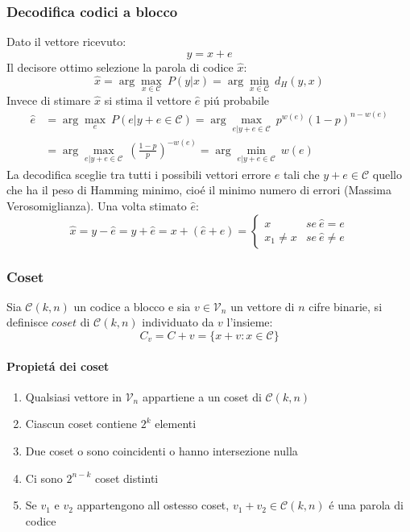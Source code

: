         \subsubsection{Decodifica codici a blocco}
            Dato il vettore ricevuto:
            \[
                y = x+e
            \]
            Il decisore ottimo selezione la parola di codice $\hat{x}$:
            \[
                \hat{x} = \arg \underset{x\in\mathcal{C}}{\max}\ P(y|x) = \arg \underset{x\in\mathcal{C}}{\min}\ d_H(y,x)   
            \]
            Invece di stimare $\hat{x}$ si stima il vettore $\hat{e}$ piú probabile
            \begin{align}
                \hat{e} &= \arg \underset{e}{\max}\ P(e|y+e\in\mathcal{C}) = \arg \underset{e|y+e\in\mathcal{C}}{\max}\ p^{w(e)}(1-p)^{n-w(e)} \nonumber \\
                        &= \arg \underset{e|y+e\in\mathcal{C}}{\max}\ \left(\frac{1-p}{p}\right)^{-w(e)} = \arg \underset{e|y+e\in\mathcal{C}}{\min}\ w(e)  \nonumber 
            \end{align}
            La decodifica sceglie tra tutti i possibili vettori errore $e$ tali che $y+e\in\mathcal{C}$ quello che ha il peso di Hamming minimo, cioé il minimo numero di 
            errori (Massima Verosomiglianza). Una volta stimato $\hat{e}$:
            \[
                \hat{x} = y-\hat{e} = y+\hat{e} = x+(\hat{e}+e)=
                \begin{cases}
                    x &se\ \hat{e} = e\nonumber\\    
                    x_1\neq x &se\ \hat{e} \neq e\nonumber    
                \end{cases}     
            \]
        \subsubsection{Coset}
            Sia $\mathcal{C}(k,n)$ un codice a blocco e sia $v\in \mathcal{V}_n$ un vettore di $n$ cifre binarie, si definisce $coset$ di
            $\mathcal{C}(k,n)$ individuato da $v$ l'insieme:
            \[
                C_v = C+v=\{ x+v: x\in\mathcal{C} \}
            \]
            \paragraph{Propietá dei coset}
            \begin{enumerate}
                \item {Qualsiasi vettore in $\mathcal{V}_n$ appartiene a un coset di $\mathcal{C}(k,n)$}
                \item {Ciascun coset contiene $2^k$ elementi}
                \item {Due coset o sono coincidenti o hanno intersezione nulla}
                \item {Ci sono $2^{n-k}$ coset distinti}
                \item {Se $v_1$ e $v_2$ appartengono all ostesso coset, $v_1 + v_2 \in \mathcal{C}(k,n)$ é una parola di codice}
            \end{enumerate}
